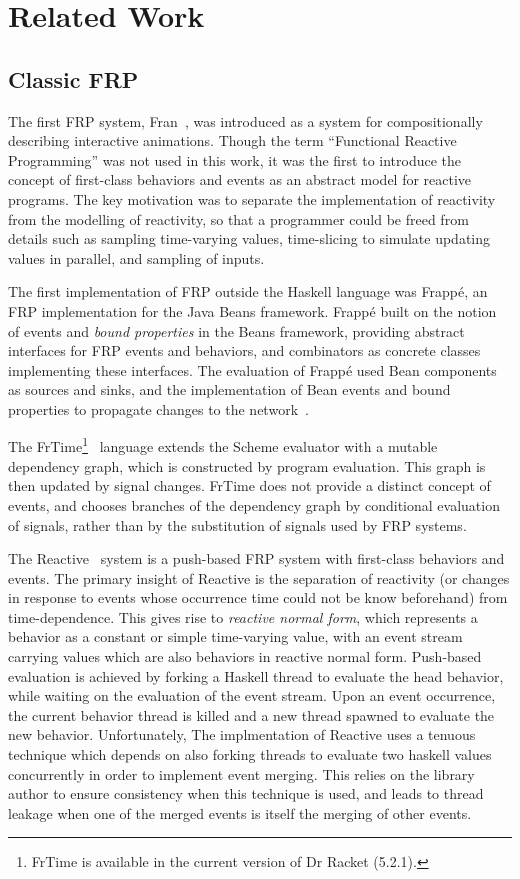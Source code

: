 \section{Related Work}
\label{section:related_work}

\subsection{Classic FRP}
\label{subsection:classic_frp}

The first FRP system, Fran~\cite{Elliott1997}, was introduced as a system for compositionally describing interactive animations.
Though the term ``Functional Reactive Programming'' was not used in this work, it was the first to introduce the concept of first-class
behaviors and events as an abstract model for reactive programs. The key motivation was to separate the implementation of reactivity
from the modelling of reactivity, so that a programmer could be freed from details such as sampling time-varying values, time-slicing
to simulate updating values in parallel, and sampling of inputs.

The first implementation of FRP outside the Haskell language was Frapp\'{e}, an FRP implementation for the Java Beans framework. Frapp\'{e} built on
the notion of events and {\em bound properties} in the Beans framework, providing abstract interfaces for FRP events and behaviors, and combinators
as concrete classes implementing these interfaces. The evaluation of Frapp\'{e} used Bean components as sources and sinks, and the implementation of
Bean events and bound properties to propagate changes to the network~\cite{Courtney2001-2}.


The FrTime\footnote{FrTime is available in the current version of Dr Racket (5.2.1).}~\cite{Cooper2006} language extends the Scheme evaluator with a mutable
dependency graph, which is constructed by program evaluation. This graph is then updated by signal changes. FrTime does not provide a distinct concept of
events, and chooses branches of the dependency graph by conditional evaluation of signals, rather than by the substitution of signals used by FRP systems.

The Reactive~\cite{Elliott2009} system is a push-based FRP system with first-class behaviors and events. The primary insight of Reactive is
the separation of reactivity (or changes in response to events whose occurrence time could not be know beforehand) from time-dependence. This
gives rise to {\em reactive normal form}, which represents a behavior as a constant or simple time-varying value, with an event stream carrying values
which are also behaviors in reactive normal form. Push-based evaluation is achieved by forking a Haskell thread to evaluate the head behavior,
while waiting on the evaluation of the event stream. Upon an event occurrence, the current behavior thread is killed and a new thread
spawned to evaluate the new behavior. Unfortunately, The implmentation of Reactive uses a tenuous technique which depends on also forking threads to evaluate
two haskell values concurrently in order to implement event merging. This relies on the library author to ensure consistency when this technique is
used, and leads to thread leakage when one of the merged events is itself the merging of other events.

